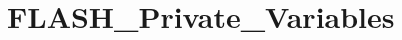 \hypertarget{group___f_l_a_s_h___private___variables}{}\section{F\+L\+A\+S\+H\+\_\+\+Private\+\_\+\+Variables}
\label{group___f_l_a_s_h___private___variables}
